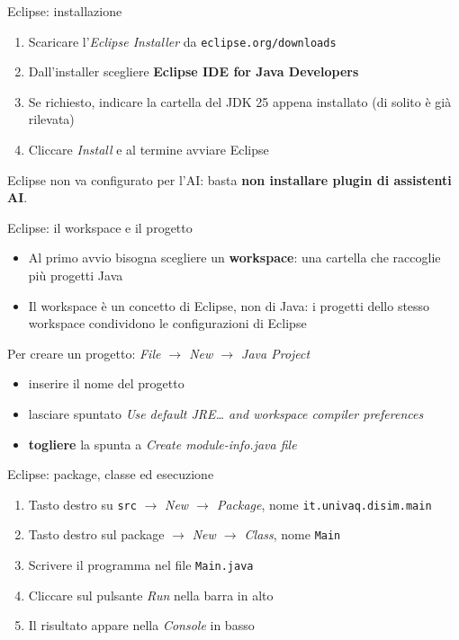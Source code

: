 \documentclass[aspectratio=169,10pt,t]{beamer}
\begin{document}
\begin{frame}{Eclipse: installazione}
  \begin{enumerate}
    \item Scaricare l'\emph{Eclipse Installer} da \texttt{eclipse.org/downloads}
    \item Dall'installer scegliere \textbf{Eclipse IDE for Java Developers}
    \item Se richiesto, indicare la cartella del JDK 25 appena installato (di solito \`e gi\`a rilevata)
    \item Cliccare \emph{Install} e al termine avviare Eclipse
  \end{enumerate}
  \vspace{0.5em}
  Eclipse non va configurato per l'AI: basta \textbf{non installare plugin di assistenti AI}.
\end{frame}

\begin{frame}{Eclipse: il workspace e il progetto}
  \begin{itemize}
    \item Al primo avvio bisogna scegliere un \textbf{workspace}: una cartella che raccoglie pi\`u progetti Java
    \item Il workspace \`e un concetto di Eclipse, non di Java: i progetti dello stesso workspace condividono le configurazioni di Eclipse
  \end{itemize}
  \vspace{0.5em}
  Per creare un progetto: \emph{File $\rightarrow$ New $\rightarrow$ Java Project}
  \begin{itemize}
    \item inserire il nome del progetto
    \item lasciare spuntato \emph{Use default JRE\ldots{} and workspace compiler preferences}
    \item \textbf{togliere} la spunta a \emph{Create module-info.java file}
  \end{itemize}
\end{frame}

\begin{frame}{Eclipse: package, classe ed esecuzione}
  \begin{enumerate}
    \item Tasto destro su \texttt{src} $\rightarrow$ \emph{New $\rightarrow$ Package}, nome \texttt{it.univaq.disim.main}
    \item Tasto destro sul package $\rightarrow$ \emph{New $\rightarrow$ Class}, nome \texttt{Main}
    \item Scrivere il programma nel file \texttt{Main.java}
    \item Cliccare sul pulsante \emph{Run} nella barra in alto
    \item Il risultato appare nella \emph{Console} in basso
  \end{enumerate}
\end{frame}
\end{document}
